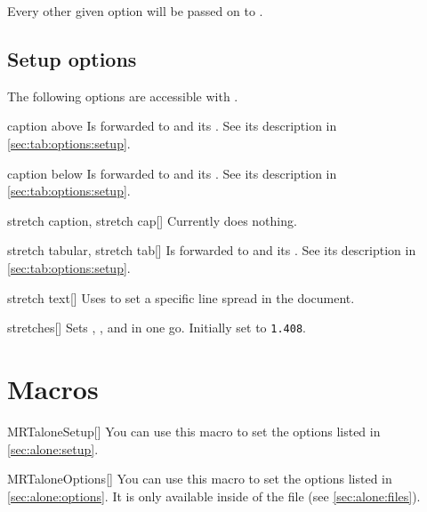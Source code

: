 \noindent
Every other given option will be passed on to .
\subsection{Setup options}\label{sec:alone:setup}%
The following options are accessible with .
\begin{describeopt}{caption above}
  Is forwarded to  and its . See its description in
  \autoref{sec:tab:options:setup}.
\end{describeopt}
\begin{describeopt}{caption below}
  Is forwarded to  and its . See its description in
  \autoref{sec:tab:options:setup}.
\end{describeopt}
\begin{describeopt}{stretch caption, stretch cap}[]
  Currently does nothing.
\end{describeopt}
\begin{describeopt}{stretch tabular, stretch tab}[]
  Is forwarded to  and its . See its description in
  \autoref{sec:tab:options:setup}.
\end{describeopt}
\begin{describeopt}{stretch text}[]
  Uses  to set a specific line spread in the document.
\end{describeopt}
\begin{describeopt}{stretches}[]
  Sets , , and  in one go.
  Initially set to \texttt{1.408}.
\end{describeopt}

\section{Macros}\label{sec:alone:macros}%
\begin{describemacro}{MRTaloneSetup}[]%
  You can use this macro to set the options listed in \autoref{sec:alone:setup}.
\end{describemacro}%
\begin{describemacro}{MRTaloneOptions}[]%
  You can use this macro to set the options listed in
  \autoref{sec:alone:options}. It is only available inside of the
   file (see \autoref{sec:alone:files}).
\end{describemacro}%


